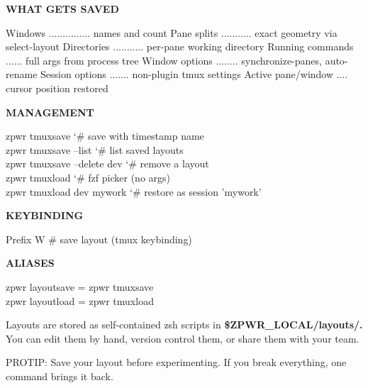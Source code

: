 \documentclass[11pt,a4paper,twoside]{book}
\begin{document}
\vspace{12pt}
{\bfseries\color{neonyellow} WHAT GETS SAVED}\vspace{4pt}

Windows ............... names and count Pane splits ........... exact geometry via select-layout Directories ........... per-pane working directory Running commands ...... full args from process tree Window options ........ synchronize-panes, auto-rename Session options ....... non-plugin tmux settings Active pane/window .... cursor position restored


\vspace{12pt}
{\bfseries\color{neonyellow} MANAGEMENT}\vspace{4pt}

\begin{codebox}
\color{neongreen}zpwr tmuxsave                 {\char`\#} save with timestamp name\\
\color{neongreen}zpwr tmuxsave --list          {\char`\#} list saved layouts\\
\color{neongreen}zpwr tmuxsave --delete dev    {\char`\#} remove a layout\\
\color{neongreen}zpwr tmuxload                 {\char`\#} fzf picker (no args)\\
\color{neongreen}zpwr tmuxload dev mywork      {\char`\#} restore as session 'mywork'\\
\end{codebox}


\vspace{12pt}
{\bfseries\color{neonyellow} KEYBINDING}\vspace{4pt}

Prefix W                      \# save layout (tmux keybinding)


\vspace{12pt}
{\bfseries\color{neonyellow} ALIASES}\vspace{4pt}

\begin{codebox}
\color{neongreen}zpwr layoutsave  = zpwr tmuxsave\\
\color{neongreen}zpwr layoutload  = zpwr tmuxload\\
\end{codebox}

Layouts are stored as self-contained zsh scripts in \textbf{\$ZPWR\_LOCAL/layouts/.} You can edit them by hand, version control them, or share them with your team.

PROTIP: Save your layout before experimenting. If you break everything, one command brings it back.
\end{document}

